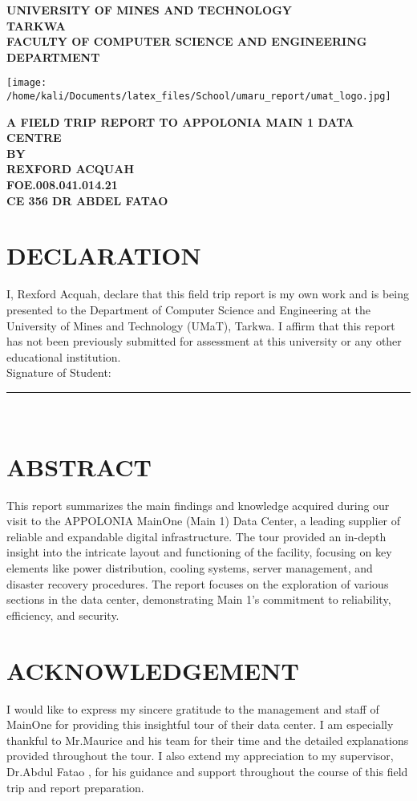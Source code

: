 \documentclass[12pt]{report}
\author{REXFORD ACQUAH}
\newcommand{\lecturer}{DR ABDEL FATAO}
\newcommand{\school}{
	\centering
	\textbf{\large UNIVERSITY OF MINES AND TECHNOLOGY \\TARKWA
		\vspace{1cm}	\\FACULTY OF COMPUTER SCIENCE AND ENGINEERING  DEPARTMENT}
}
\newcommand{\rpaim}{
	\centering

	\textbf{\large A FIELD TRIP REPORT TO APPOLONIA MAIN 1 DATA CENTRE \\ BY \\REXFORD ACQUAH\\
		FOE.008.041.014.21 \\ CE 356 \vspace{1.5em} \lecturer}
}
\begin{document}
\begin{titlepage}
	\school
	\vspace{2cm}
	\begin{center}
		\texttt{[image: /home/kali/Documents/latex\_files/School/umaru\_report/umat\_logo.jpg]} %
	\end{center}
	\vspace{1cm}
	\rpaim
	\vfill

\end{titlepage}

\section*{DECLARATION}
I, Rexford Acquah, declare that this field trip report is my own work and is being presented to the Department of Computer Science and Engineering at the University of Mines and
Technology (UMaT), Tarkwa. I affirm that this report has not been previously submitted for
assessment at this university or any other educational institution.\\
Signature of Student:\rule[0.1em]{20em}{1pt}\\[0.3cm]

\newpage
\section*{ABSTRACT}
This report summarizes the main findings and knowledge acquired during our visit to the APPOLONIA MainOne (Main 1) Data Center, a leading supplier of reliable and expandable digital infrastructure. The tour provided an in-depth insight into the intricate layout and functioning of the facility, focusing on key elements like power distribution, cooling systems, server management, and disaster recovery procedures. The report focuses on the exploration of various sections in the data center, demonstrating Main 1's commitment to reliability, efficiency, and security.

\newpage
\section*{ACKNOWLEDGEMENT}
I would like to express my sincere gratitude to the management and staff of MainOne for providing this insightful tour of their data center. I am especially thankful to Mr.Maurice and his team for their time and the detailed explanations provided throughout the tour. I also extend my appreciation to my supervisor, Dr.Abdul Fatao , for his guidance and support throughout the course of this field trip and report preparation.
\end{document}
